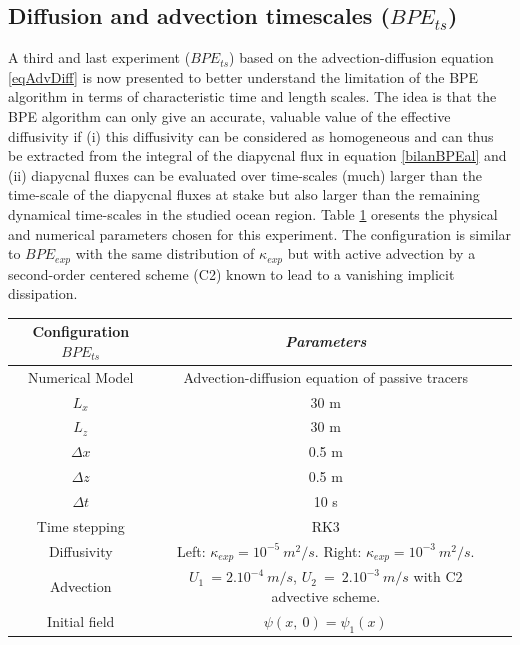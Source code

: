 \subsection{Diffusion and advection timescales ($BPE_{ts}$)}
A third and last experiment ($BPE_{ts}$) based on the advection-diffusion equation \ref{eqAdvDiff} is now presented to better understand the limitation of the BPE algorithm in terms of characteristic time and length scales. The idea is that the BPE algorithm can only give an accurate, valuable value of the effective diffusivity if (i) this diffusivity can be considered as homogeneous and can thus be extracted from the integral of the diapycnal flux in equation \ref{bilanBPEal} and (ii) diapycnal fluxes can be evaluated over time-scales (much) larger than the time-scale of the diapycnal fluxes at stake but also larger than the remaining dynamical time-scales in the studied ocean region.
Table \ref{tab_NUMLAB_ts} oresents the physical and numerical parameters chosen for this experiment. The configuration is similar to $BPE_{exp}$ with the same distribution of $\kappa_{exp}$ but with active advection by a second-order centered scheme (C2) known to lead to a vanishing implicit dissipation.
\begin{table}[h]
        \centering
        \begin{tabular}{|c|c|c|}
                \hline
                Configuration $BPE_{ts}$ & \textit{Parameters}\\
                \hline 
                Numerical Model & Advection-diffusion equation of passive tracers\\
                $L_x$ & 30 m\\
                $L_z$ & 30 m\\
                $\Delta x$ & 0.5 m\\
                $\Delta z$ & 0.5 m\\
                $\Delta t$ & 10 s\\
                Time stepping & RK3 \\
                Diffusivity & Left: $\kappa_{exp} = 10^{-5} \ m^2/s$. Right: $\kappa_{exp} = 10^{-3} \ m^2/s$.\\
                Advection & $U_1\ = 2.10^{-4}\ m/s$, $U_2\ =\ 2.10^{-3}\ m/s$ with C2 advective scheme.\\
                Initial field & $\psi(x,\ 0)=\psi_1(x)$\\
                \hline
        \end{tabular}
        \label{tab_NUMLAB_ts}
\end{table}


